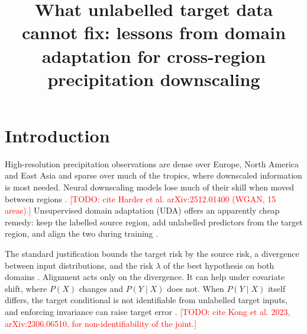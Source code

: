 \documentclass{ametsocV6.2}
\title{What unlabelled target data cannot fix: lessons from domain\\
adaptation for cross-region precipitation downscaling}
\affiliation{\aff{a}{Faculty of Geosciences and Environment and Expertise Center for
Climate Extremes, University of Lausanne, Lausanne, Switzerland}}
\newcommand{\todo}[1]{\textcolor{red}{[TODO: #1]}}
\begin{document}
\maketitle




\section{Introduction}\label{sec:intro}

High-resolution precipitation observations are dense over Europe, North
America and East Asia and sparse over much of the tropics, where
downscaled information is most needed. Neural downscaling models lose
much of their skill when moved between regions
\citep{harder2025rainshift}. \todo{cite Harder et al. arXiv:2512.01400
(WGAN, 15 areas).} Unsupervised domain adaptation (UDA) offers an
apparently cheap remedy: keep the labelled source region, add unlabelled
predictors from the target region, and align the two during training
\citep{ganin2016domain,long2015learning,sun2016deep}.

The standard justification bounds the target risk by the source risk, a
divergence between input distributions, and the risk $\lambda$ of the best
hypothesis on both domains
\citep{bendavid2010theory,redko2017theoretical}. Alignment acts only on
the divergence. It can help under covariate shift, where $P(X)$ changes
and $P(Y\mid X)$ does not. When $P(Y\mid X)$ itself differs, the target
conditional is not identifiable from unlabelled target inputs, and
enforcing invariance can raise target error
\citep{zhao2019invariant,johansson2019support}. \todo{cite Kong et al.
2023, arXiv:2306.06510, for non-identifiability of the joint.}
\end{document}
